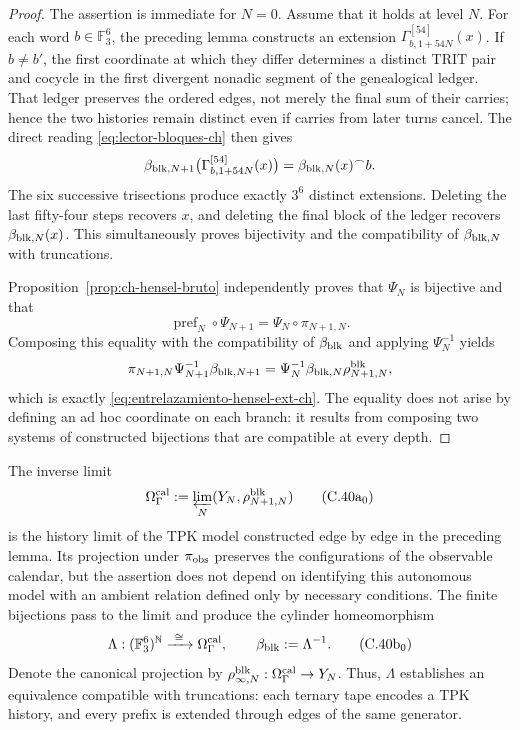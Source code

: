 \begin{proof}
The assertion is immediate for \(N=0\). Assume that it holds at level
\(N\). For each word \(b\in\mathbb F_3^6\), the preceding lemma constructs an extension
    \(\Gamma_{b,1+54N}^{[54]}(x)\). If \(b\ne b'\), the first coordinate at
which they differ determines a distinct TRIT pair and cocycle in the first
divergent nonadic segment of the genealogical ledger. That ledger preserves
the ordered edges, not merely the final sum of their carries; hence the two
histories remain distinct even if carries from later turns cancel.
The direct reading \eqref{eq:lector-bloques-ch} then gives
\begin{equation}
 \beta_{{\rm blk},N+1}
 \bigl(\Gamma_{b,1+54N}^{[54]}(x)\bigr)
 =\beta_{{\rm blk},N}(x)^\frown b.
 \label{eq:beta-concatenacion-demostrada-ch}
\end{equation}
The six successive trisections produce exactly \(3^6\) distinct extensions.
Deleting the last fifty-four steps recovers \(x\), and deleting the final
block of the ledger recovers \(\beta_{{\rm blk},N}(x)\). This simultaneously
proves bijectivity and the compatibility of \(\beta_{{\rm blk},N}\) with
truncations.

Proposition~\ref{prop:ch-hensel-bruto} independently proves that
\(\Psi_N\) is bijective and that
\[
 \operatorname{pref}_N\circ\Psi_{N+1}
 =\Psi_N\circ\pi_{N+1,N}.
\]
Composing this equality with the compatibility of \(\beta_{\rm blk}\) and
applying \(\Psi_N^{-1}\) yields
\[
 \pi_{N+1,N}\Psi_{N+1}^{-1}\beta_{{\rm blk},N+1}
 =\Psi_N^{-1}\beta_{{\rm blk},N}\rho^{\rm blk}_{N+1,N},
\]
which is exactly \eqref{eq:entrelazamiento-hensel-ext-ch}. The equality does
not arise by defining an ad hoc coordinate on each branch: it results from
composing two systems of constructed bijections that are compatible at every
depth.
\end{proof}

The inverse limit
\[
 \Omega_\Gamma^{\rm cal}:=
 \varprojlim_N(Y_N,\rho^{\rm blk}_{N+1,N})
\tag{C.40a$_0$}
\label{eq:omega-gamma-catalogal-ch}
\]
is the history limit of the TPK model constructed edge by edge in the
preceding lemma. Its projection under \(\pi_{\rm obs}\) preserves the
configurations of the observable calendar, but the assertion does not depend
on identifying this autonomous model with an ambient relation defined only
by necessary conditions. The finite bijections pass to the limit and produce
the cylinder homeomorphism
\[
 \Lambda:(\mathbb F_3^6)^{\mathbb N}
 \xrightarrow{\ \cong\ }\Omega_\Gamma^{\rm cal},
 \qquad
 \beta_{\rm blk}:=\Lambda^{-1}.
\tag{C.40b$_0$}
\label{eq:homeomorfismo-calibrado-ch}
\]
Denote the canonical projection by
\(\rho^{\rm blk}_{\infty,N}:\Omega_\Gamma^{\rm cal}\to Y_N\).
Thus, \(\Lambda\) establishes an equivalence compatible with truncations:
each ternary tape encodes a TPK history, and every prefix is extended through
edges of the same generator.

